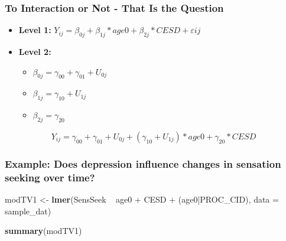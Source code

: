 \documentclass[]{article}
\newenvironment{Shaded}{\begin{snugshade}}{\end{snugshade}}
\newcommand{\KeywordTok}[1]{\textcolor[rgb]{0.13,0.29,0.53}{\textbf{{#1}}}}
\newcommand{\DataTypeTok}[1]{\textcolor[rgb]{0.13,0.29,0.53}{{#1}}}
\newcommand{\StringTok}[1]{\textcolor[rgb]{0.31,0.60,0.02}{{#1}}}
\newcommand{\NormalTok}[1]{{#1}}
\begin{document}
\subsubsection{To Interaction or Not - That Is the
Question}\label{to-interaction-or-not---that-is-the-question}

\begin{itemize}
  \item \textbf{Level 1:} $Y_{ij} = \beta_{0j} + \beta_{1j}*age0 + \beta_{2j}*CESD + \varepsilon{ij}$
  \item \textbf{Level 2:} 
    \begin{itemize} 
      \item $\beta_{0j} = \gamma_{00} + \gamma_{01} + U_{0j}$
      \item $\beta_{1j} = \gamma_{10} + U_{1j}$
      \item $\beta_{2j} = \gamma_{20}$
    \end{itemize}
\end{itemize}

\[Y_{ij} =  \gamma_{00} + \gamma_{01} + U_{0j} + (\gamma_{10} + U_{1j})*age0 + \gamma_{20}*CESD\]

\subsubsection{Example: Does depression influence changes in sensation
seeking over
time?}\label{example-does-depression-influence-changes-in-sensation-seeking-over-time}

\small

\begin{Shaded}
\begin{Highlighting}[]
\NormalTok{modTV1 <-}\StringTok{ }\KeywordTok{lmer}\NormalTok{(SensSeek ~}\StringTok{ }\NormalTok{age0 +}\StringTok{ }\NormalTok{CESD +}\StringTok{ }\NormalTok{(age0|PROC_CID), }\DataTypeTok{data =} \NormalTok{sample_dat)}
\end{Highlighting}
\end{Shaded}

\small

\begin{Shaded}
\begin{Highlighting}[]
\KeywordTok{summary}\NormalTok{(modTV1)}
\end{Highlighting}
\end{Shaded}
\end{document}
